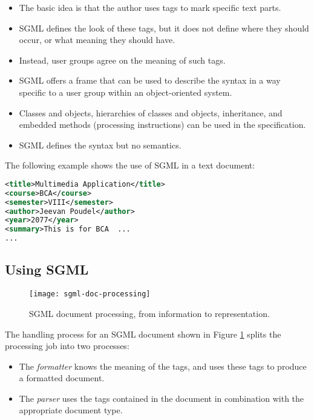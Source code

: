 \begin{multicols}{2}
	\begin{itemize}
		\item The basic idea is that the author uses tags to mark specific text parts. 
		\item SGML defines the look of these tags, but it does not define where they should occur, or what meaning they should have. 
		\item Instead, user groups agree on the meaning of such tags.
		\item SGML offers a frame that can be used to describe the syntax in a way specific to a user group within an object-oriented system. 
		\item Classes and objects, hierarchies of classes and objects, inheritance, and embedded methods (processing instructions) can be used in	the specification.
		\item SGML defines the syntax but no semantics.
	\end{itemize}
\end{multicols}


The following example shows the use of SGML in a text document:
\begin{lstlisting}[language=xml, frame=single]
<title>Multimedia Application</title>
<course>BCA</course>
<semester>VIII</semester>
<author>Jeevan Poudel</author>
<year>2077</year>
<summary>This is for BCA  ...
...
\end{lstlisting}

\subsection*{Using SGML}
\begin{figure}[ht!]
	\centering
	\texttt{[image: sgml-doc-processing]}
	\caption{SGML document processing, from information to representation.}{\label{fig:sgml-doc-processing}}
\end{figure}

The handling process for an SGML document shown in Figure {\ref{fig:sgml-doc-processing}} splits the processing job into two processes:
\begin{itemize}
	\item The \textit{formatter} knows the meaning of the tags, and uses these tags to produce a formatted document. 
	
	\item The \textit{parser} uses the tags contained in the document in combination with the appropriate document type.
\end{itemize}

